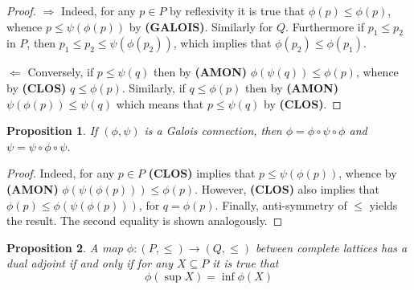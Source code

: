 \documentclass[a4paper]{article}
\newcommand{\brac}[1]{{\left ( #1 \right )}}
\newtheorem{prop}{Proposition}
\begin{document}
\begin{proof}
$\Rightarrow$ Indeed, for any $p\in P$ by reflexivity it is true that $\phi(p)\leq \phi(p)$, whence $p\leq \psi\brac{\phi(p)}$ by \textbf{(GALOIS)}. Similarly for $Q$. Furthermore if $p_1\leq p_2$ in $P$, then $p_1\leq p_2\leq \psi\brac{\phi(p_2)}$, which implies that $\phi(p_2)\leq \phi(p_1)$.

$\Leftarrow$ Conversely, if $p\leq \psi(q)$ then by \textbf{(AMON)} $\phi\brac{\psi(q)}\leq \phi(p)$, whence by \textbf{(CLOS)} $q\leq \phi(p)$. Similarly, if $q\leq \phi(p)$ then by \textbf{(AMON)} $\psi\brac{\phi(p)}\leq \psi(q)$ which means that $p\leq \psi(q)$ by \textbf{(CLOS)}.
\end{proof}

\begin{prop} If $(\phi,\psi)$ is a Galois connection, then $\phi = \phi\circ \psi\circ \phi$ and $\psi = \psi\circ \phi\circ \psi$.
\end{prop}

\begin{proof}
Indeed, for any $p\in P$ \textbf{(CLOS)} implies that $p\leq \psi\brac{\phi(p)}$, whence by \textbf{(AMON)} $\phi\brac{\psi\brac{\phi(p)}}\leq \phi(p)$. However, \textbf{(CLOS)} also implies that $\phi(p)\leq \phi\brac{\psi\brac{\phi(p)}}$, for $q=\phi(p)$. Finally, anti-symmetry of $\leq$ yields the result. The second equality is shown analogously.
\end{proof}

\begin{prop} A map $\phi:(P,\leq)\to (Q,\leq)$ between complete lattices has a dual adjoint if and only if for any $X\subseteq P$ it is true that \[\phi\brac{\sup X} = \inf \phi(X)\]
\end{prop}
\end{document}
